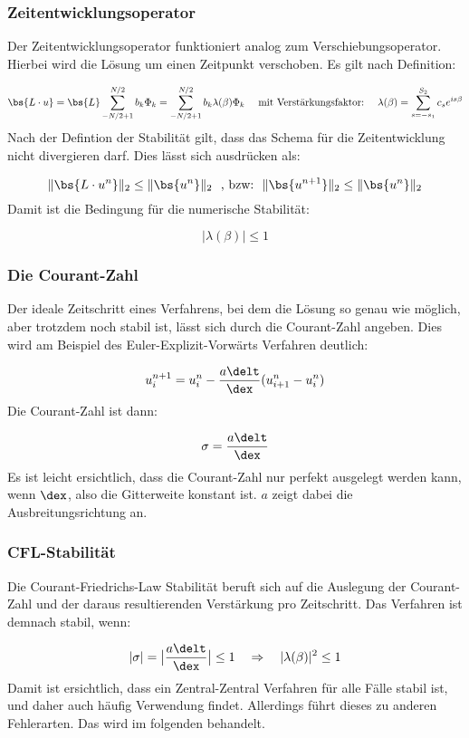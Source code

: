\subsubsection{Zeitentwicklungsoperator}
Der Zeitentwicklungsoperator funktioniert analog zum Verschiebungsoperator. Hierbei wird die L\"osung um einen Zeitpunkt verschoben. Es gilt nach Definition:
\par
\begin{equation*}
	\bs{L\cdot u} = \bs{L} \sum_{-N/2+1}^{N/2} b_k \Phi_k = \sum_{-N/2+1}^{N/2} b_k \lambda(\beta) \Phi_k~~~~\textrm{mit Verst\"arkungsfaktor:}~~~~\lambda(\beta) = \sum_{s=-s_1}^{S_2} c_s e^{i s \beta}
\end{equation*}
Nach der Defintion der Stabilit\"at gilt, dass das Schema f\"ur die Zeitentwicklung nicht divergieren darf. Dies l\"asst sich ausdr\"ucken als:
\par
\begin{equation*}
	\|\bs{L\cdot u^n}\|_2 \leq \|\bs{u^n}\|_2~~\textrm{, bzw:}~~\|\bs{u^{n+1}}\|_2 \leq \|\bs{u^n}\|_2
\end{equation*}
Damit ist die Bedingung f\"ur die numerische Stabilit\"at:
\par
\begin{equation*}
	|\lambda(\beta)| \leq 1
\end{equation*}

\subsubsection{Die Courant-Zahl}
Der ideale Zeitschritt eines Verfahrens, bei dem die L\"osung so genau wie m\"oglich, aber trotzdem noch stabil ist, l\"asst sich durch die Courant-Zahl angeben. Dies wird am Beispiel des Euler-Explizit-Vorw\"arts Verfahren deutlich:
\par
\begin{equation*}
	u_i^{n+1} = u_i^n - \frac{a\delt}{\dex}(u_{i+1}^n - u_i^n)
\end{equation*}
Die Courant-Zahl ist dann:
\par
\begin{equation*}
	\sigma = \frac{a\delt}{\dex}
\end{equation*}
Es ist leicht ersichtlich, dass die Courant-Zahl nur perfekt ausgelegt werden kann, wenn $\dex$, also die Gitterweite konstant ist. $a$ zeigt dabei die Ausbreitungsrichtung an.

\subsubsection{CFL-Stabilit\"at}
Die Courant-Friedrichs-Law Stabilit\"at beruft sich auf die Auslegung der Courant-Zahl und der daraus resultierenden Verst\"arkung pro Zeitschritt. Das Verfahren ist demnach stabil, wenn:
\par
\begin{equation*}
	|\sigma| = \big|\frac{a\delt}{\dex}\big| \leq 1 ~~~\Rightarrow~~~ |\lambda(\beta)|^2 \leq 1
\end{equation*}
Damit ist ersichtlich, dass ein Zentral-Zentral Verfahren f\"ur alle F\"alle stabil ist, und daher auch h\"aufig Verwendung findet. Allerdings f\"uhrt dieses zu anderen Fehlerarten. Das wird im folgenden behandelt.

